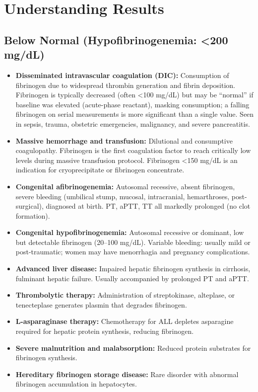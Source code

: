 \section*{Understanding Results}

\subsection*{Below Normal (Hypofibrinogenemia: <200 mg/dL)}
\begin{itemize}
  \item \textbf{Disseminated intravascular coagulation (DIC):} Consumption of fibrinogen due to widespread thrombin generation and fibrin deposition. Fibrinogen is typically decreased (often <100 mg/dL) but may be ``normal'' if baseline was elevated (acute-phase reactant), masking consumption; a falling fibrinogen on serial measurements is more significant than a single value. Seen in sepsis, trauma, obstetric emergencies, malignancy, and severe pancreatitis.
  \item \textbf{Massive hemorrhage and transfusion:} Dilutional and consumptive coagulopathy. Fibrinogen is the first coagulation factor to reach critically low levels during massive transfusion protocol. Fibrinogen <150 mg/dL is an indication for cryoprecipitate or fibrinogen concentrate.
  \item \textbf{Congenital afibrinogenemia:} Autosomal recessive, absent fibrinogen, severe bleeding (umbilical stump, mucosal, intracranial, hemarthroses, post-surgical), diagnosed at birth. PT, aPTT, TT all markedly prolonged (no clot formation).
  \item \textbf{Congenital hypofibrinogenemia:} Autosomal recessive or dominant, low but detectable fibrinogen (20--100 mg/dL). Variable bleeding: usually mild or post-traumatic; women may have menorrhagia and pregnancy complications.
  \item \textbf{Advanced liver disease:} Impaired hepatic fibrinogen synthesis in cirrhosis, fulminant hepatic failure. Usually accompanied by prolonged PT and aPTT.
  \item \textbf{Thrombolytic therapy:} Administration of streptokinase, alteplase, or tenecteplase generates plasmin that degrades fibrinogen.
  \item \textbf{L-asparaginase therapy:} Chemotherapy for ALL depletes asparagine required for hepatic protein synthesis, reducing fibrinogen.
  \item \textbf{Severe malnutrition and malabsorption:} Reduced protein substrates for fibrinogen synthesis.
  \item \textbf{Hereditary fibrinogen storage disease:} Rare disorder with abnormal fibrinogen accumulation in hepatocytes.
\end{itemize}

